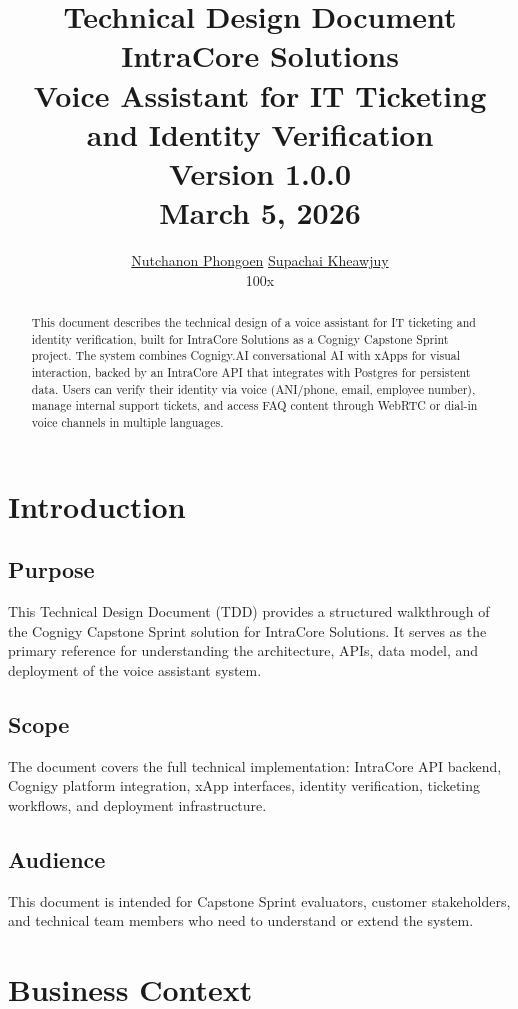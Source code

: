 \documentclass{article}
\title{\textbf{Technical Design Document}\\[0.5em]
\large IntraCore Solutions\\
\large Voice Assistant for IT Ticketing and Identity Verification\\
\large Version 1.0.0\\
\large March 5, 2026}
\author{
  \href{mailto:earth@100x.fi}{Nutchanon Phongoen} \quad \href{mailto:boss.spicyz@100x.fi}{Supachai Kheawjuy}\\[1em]
  100x
}
\date{}
\begin{document}
\maketitle

\begin{abstract}
This document describes the technical design of a voice assistant for IT ticketing and identity verification, built for IntraCore Solutions as a Cognigy Capstone Sprint project. The system combines Cognigy.AI conversational AI with xApps for visual interaction, backed by an IntraCore API that integrates with Postgres for persistent data. Users can verify their identity via voice (ANI/phone, email, employee number), manage internal support tickets, and access FAQ content through WebRTC or dial-in voice channels in multiple languages.
\end{abstract}

\tableofcontents
\newpage

\section{Introduction}

\subsection{Purpose}
This Technical Design Document (TDD) provides a structured walkthrough of the Cognigy Capstone Sprint solution for IntraCore Solutions. It serves as the primary reference for understanding the architecture, APIs, data model, and deployment of the voice assistant system.

\subsection{Scope}
The document covers the full technical implementation: IntraCore API backend, Cognigy platform integration, xApp interfaces, identity verification, ticketing workflows, and deployment infrastructure.

\subsection{Audience}
This document is intended for Capstone Sprint evaluators, customer stakeholders, and technical team members who need to understand or extend the system.

\section{Business Context}
\end{document}
